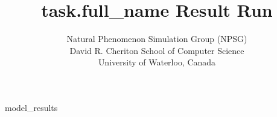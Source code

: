 \documentclass{article}
\begin{document}
\title{{{task.full_name}} Result Run}
\author{Natural Phenomenon Simulation Group (NPSG)\\David R. Cheriton School of Computer Science\\University of Waterloo, Canada}

\maketitle

{{model_results}}
\end{document}
